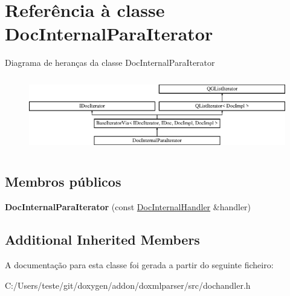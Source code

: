 \hypertarget{class_doc_internal_para_iterator}{\section{Referência à classe Doc\-Internal\-Para\-Iterator}
\label{class_doc_internal_para_iterator}
}
Diagrama de heranças da classe Doc\-Internal\-Para\-Iterator\begin{figure}[H]
\begin{center}
\leavevmode
\includegraphics[height=3.294118cm]{class_doc_internal_para_iterator}
\end{center}
\end{figure}
\subsection*{Membros públicos}
\begin{DoxyCompactItemize}
\item 
\hypertarget{class_doc_internal_para_iterator_a78c406d3d599ba12c1e7a2bcc7765bdc}{{\bfseries Doc\-Internal\-Para\-Iterator} (const \hyperlink{class_doc_internal_handler}{Doc\-Internal\-Handler} \&handler)}\label{class_doc_internal_para_iterator_a78c406d3d599ba12c1e7a2bcc7765bdc}

\end{DoxyCompactItemize}
\subsection*{Additional Inherited Members}


A documentação para esta classe foi gerada a partir do seguinte ficheiro\-:\begin{DoxyCompactItemize}
\item 
C\-:/\-Users/teste/git/doxygen/addon/doxmlparser/src/dochandler.\-h\end{DoxyCompactItemize}
